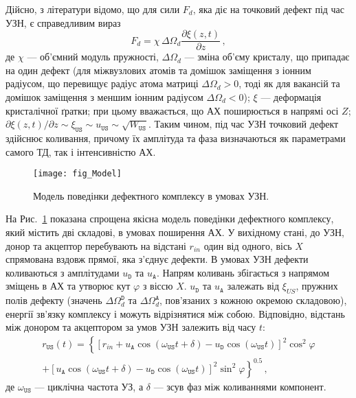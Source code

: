 Дійсно, з літератури \cite{MirzadeJAP2011,PELESHCHAK:UPJ2016} відомо, що для сили $F_d$, яка діє на точковий дефект під час УЗН,
є справедливим вираз
\begin{equation}
\label{eqFd}
F_d=\chi\,\Delta\Omega_d\frac{\partial \xi(z,t)}{\partial z}\,,
\end{equation}
де
$\chi$ --- об'ємний модуль пружності,
$\Delta\Omega_d$ --- зміна об'єму кристалу, що припадає на один дефект
(для міжвузлових атомів та домішок заміщення з іонним радіусом, що перевищує радіус атома матриці $\Delta\Omega_d > 0$,
тоді як для вакансій та домішок заміщення з меншим іонним радіусом $\Delta\Omega_d < 0$);
$\xi$ --- деформація кристалічної ґратки;
при цьому вважається, що АХ поширюється в напрямі осі $Z$;
$\partial \xi(z,t)/\partial z\sim \xi_{\mathtt{US}}\sim u_\mathtt{US} \sim \sqrt{W_\mathtt{US}}$.
Таким чином, під час УЗН точковий дефект здійснює коливання, причому їх амплітуда та фаза визначаються як параметрами самого ТД, так і інтенсивністю АХ.


\begin{figure}[b]
\center
\texttt{[image: fig\_Model]}
\caption{\label{fig_Model}
Модель поведінки дефектного комплексу в умовах УЗН.
}%
\end{figure}

На Рис.~\ref{fig_Model} показана спрощена якісна модель поведінки дефектного комплексу, який містить дві складові,
в умовах поширення АХ.
У вихідному стані, до УЗН, донор та акцептор перебувають на відстані $r_{in}$ один від одного,
вісь $X$ спрямована вздовж прямої, яка з'єднує дефекти.
В умовах УЗН дефекти коливаються з амплітудами $u_\mathtt{D}$ та $u_\mathtt{A}$.
Напрям коливань збігається з напрямом зміщень в АХ та утворює кут $\varphi$ з віссю $X$.
$u_\mathtt{D}$ та $u_\mathtt{A}$ залежать від $\xi_{U\!S}$, пружних полів дефекту (значень $\Delta\Omega_d^\mathtt{D}$ та $\Delta\Omega_d^\mathtt{A}$,
пов'язаних з кожною окремою складовою), енергії зв'язку комплексу і можуть відрізнятися між собою.
Відповідно, відстань між донором та акцептором за умов УЗН залежить від часу $t$:
\begin{multline}
\label{eqrUS}
r_\mathtt{US}(t)=\left\{[r_{in}+u_\mathtt{A}\cos(\omega_\mathtt{US}t+\delta)-u_\mathtt{D}\cos(\omega_\mathtt{US}t)]^2\cos^2\varphi \right.\\
    \left.+ [u_\mathtt{A}\cos(\omega_\mathtt{US}t+\delta)-u_\mathtt{D}\cos(\omega_\mathtt{US}t)]^2\sin^2\varphi\right\}^{0.5}\,,
\end{multline}
де
$\omega_\mathtt{US}$ --- циклічна частота УЗ, а
$\delta$ --- зсув фаз між коливаннями компонент.

